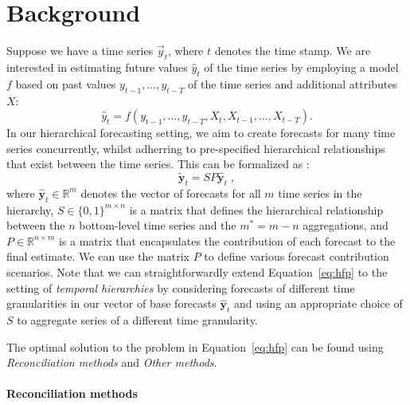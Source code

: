 \documentclass[preprint, 3p, times, twocolumn]{elsarticle}
\begin{document}
\section{Background} \label{sec:background}
Suppose we have a time series \(\vec{y}_t\), where \(t\) denotes the time stamp. We are interested in estimating future values \(\hat{y}_{t}\) of the time series by employing a model \(f\) based on past values \(y_{t-1}, \dots, y_{t-T}\) of the time series and additional attributes \(X\):
\begin{equation}
  \hat{y}_{t} = f(y_{t-1}, \dots, y_{t-T}, X_{t}, X_{t-1}, \dots, X_{t-T}).
\end{equation}
In our hierarchical forecasting setting, we aim to create forecasts for many time series concurrently, whilst adherring to pre-specified hierarchical relationships that exist between the time series. This can be formalized as \cite{hyndman_forecasting_2021}:
\begin{equation} \label{eq:hfp}
  \tilde{\textbf{y}}_{t} = SP\hat{\textbf{y}}_{t} \;,
\end{equation}
where \(\hat{\textbf{y}}_{t} \in \mathbb{R}^{m} \) denotes the vector of forecasts for all \(m\) time series in the hierarchy, \(S \in \{0, 1\}^{m \times n}\) is a matrix that defines the hierarchical relationship between the \(n\) bottom-level time series and the \(m^* = m - n\) aggregations, and \(P \in \mathbb{R}^{n \times m}\) is a matrix that encapsulates the contribution of each forecast to the final estimate. We can use the matrix \(P\) to define various forecast contribution scenarios. Note that we can straightforwardly extend Equation~\eqref{eq:hfp} to the setting of \textit{temporal hierarchies} \cite{athanasopoulos_forecasting_2017,rangapuram_coherent_2023} by considering forecasts of different time granularities in our vector of base forecasts \(\hat{\textbf{y}}_{t}\) and using an appropriate choice of \(S\) to aggregate series of a different time granularity.

The optimal solution to the problem in Equation~\eqref{eq:hfp} can be found using \textit{Reconciliation methods} and \textit{Other methods}.

\paragraph{Reconciliation methods}
\end{document}
